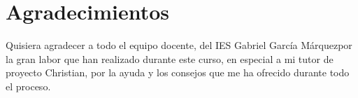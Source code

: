 \documentclass[12pt,twoside,titlepage]{report}
\newcommand{\nombreautor}{Sergio Simón Fernández}
\newcommand{\nombretutor}{Christian Alcaide Moreno}
\newcommand{\titulotrabajo}{Supercomparator}
\newcommand{\escuela}{IES Gabriel García Márquez}
\newcommand{\escuelalargo}{Escuela Técnica Superior de Ingeniería Informática}
\newcommand{\universidad}{XXX}
\newcommand{\fecha}{Fecha}
\newcommand\blankpage{%
    \newpage
    \null
    \thispagestyle{empty}%
    \newpage}
\begin{document}








\hypersetup{pageanchor=true}

\normalsize
\afterpage{\blankpage} %






\setlength{\parskip}{0.75em}
\renewcommand{\baselinestretch}{1.25}

\setcounter{page}{2}



\chapter*{Agradecimientos}

Quisiera agradecer a todo el equipo docente, del \escuela por la gran labor que han realizado durante este curso, en especial a mi tutor de proyecto Christian, por la ayuda y los consejos que me ha ofrecido durante todo el proceso.
\end{document}
